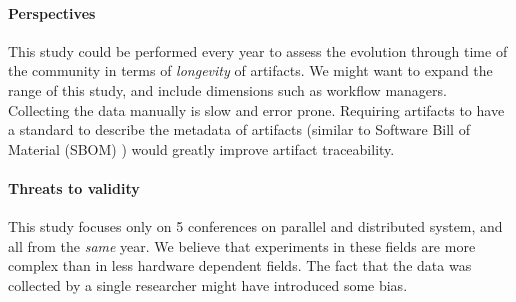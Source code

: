 \documentclass[sigconf,natbib=false]{acmart}
\newcommand{\eg}{\emph{e.g.,}}
\newcommand{\aeval}{Artifact Evaluation}
\newcommand{\todo}[1]{{\color{red}{TODO: #1}}}
\begin{document}
\paragraph{Perspectives}

This study could be performed every year to assess the evolution through time of the community in terms of \emph{longevity} of artifacts.
We might want to expand the range of this study, and include dimensions such as workflow managers.
Collecting the data manually is slow and error prone.
Requiring artifacts to have a standard to describe the metadata of artifacts (similar to Software Bill of Material (SBOM) \cite{sbom, xia2023empirical}) would greatly improve artifact traceability.%

\paragraph{Threats to validity}

This study focuses only on 5 conferences on parallel and distributed system, and all from the \emph{same} year.
We believe that experiments in these fields are more complex than in less hardware dependent fields.
The fact that the data was collected by a single researcher might have introduced some bias.


% 
% 
% 
% 
\end{document}
